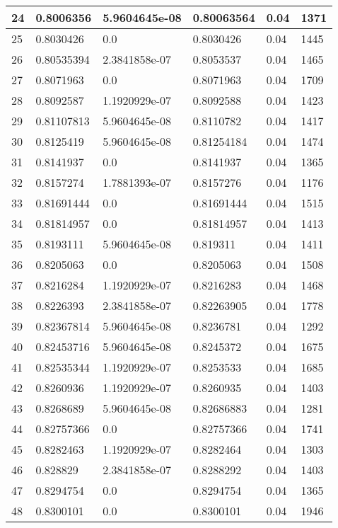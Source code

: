 \begin{longtable}{|l|l|l|l|l|l|}
24 & 0.8006356 & 5.9604645e-08 & 0.80063564 & 0.04 & 1371 \\ \hline 
25 & 0.8030426 & 0.0 & 0.8030426 & 0.04 & 1445 \\ \hline 
26 & 0.80535394 & 2.3841858e-07 & 0.8053537 & 0.04 & 1465 \\ \hline 
27 & 0.8071963 & 0.0 & 0.8071963 & 0.04 & 1709 \\ \hline 
28 & 0.8092587 & 1.1920929e-07 & 0.8092588 & 0.04 & 1423 \\ \hline 
29 & 0.81107813 & 5.9604645e-08 & 0.8110782 & 0.04 & 1417 \\ \hline 
30 & 0.8125419 & 5.9604645e-08 & 0.81254184 & 0.04 & 1474 \\ \hline 
31 & 0.8141937 & 0.0 & 0.8141937 & 0.04 & 1365 \\ \hline 
32 & 0.8157274 & 1.7881393e-07 & 0.8157276 & 0.04 & 1176 \\ \hline 
33 & 0.81691444 & 0.0 & 0.81691444 & 0.04 & 1515 \\ \hline 
34 & 0.81814957 & 0.0 & 0.81814957 & 0.04 & 1413 \\ \hline 
35 & 0.8193111 & 5.9604645e-08 & 0.819311 & 0.04 & 1411 \\ \hline 
36 & 0.8205063 & 0.0 & 0.8205063 & 0.04 & 1508 \\ \hline 
37 & 0.8216284 & 1.1920929e-07 & 0.8216283 & 0.04 & 1468 \\ \hline 
38 & 0.8226393 & 2.3841858e-07 & 0.82263905 & 0.04 & 1778 \\ \hline 
39 & 0.82367814 & 5.9604645e-08 & 0.8236781 & 0.04 & 1292 \\ \hline 
40 & 0.82453716 & 5.9604645e-08 & 0.8245372 & 0.04 & 1675 \\ \hline 
41 & 0.82535344 & 1.1920929e-07 & 0.8253533 & 0.04 & 1685 \\ \hline 
42 & 0.8260936 & 1.1920929e-07 & 0.8260935 & 0.04 & 1403 \\ \hline 
43 & 0.8268689 & 5.9604645e-08 & 0.82686883 & 0.04 & 1281 \\ \hline 
44 & 0.82757366 & 0.0 & 0.82757366 & 0.04 & 1741 \\ \hline 
45 & 0.8282463 & 1.1920929e-07 & 0.8282464 & 0.04 & 1303 \\ \hline 
46 & 0.828829 & 2.3841858e-07 & 0.8288292 & 0.04 & 1403 \\ \hline 
47 & 0.8294754 & 0.0 & 0.8294754 & 0.04 & 1365 \\ \hline 
48 & 0.8300101 & 0.0 & 0.8300101 & 0.04 & 1946 \\ \hline 

\end{longtable}
